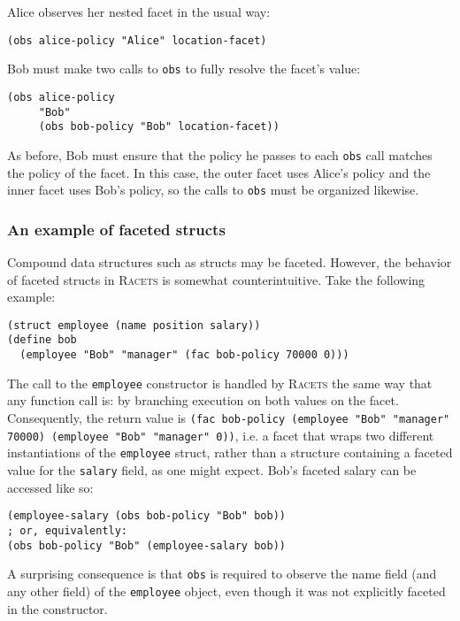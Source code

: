 \documentclass{article}
\begin{document}
Alice observes her nested facet in the usual way:

\begin{lstlisting}
(obs alice-policy "Alice" location-facet)
\end{lstlisting}

Bob must make two calls to \texttt{obs} to fully resolve the facet's value:

\begin{lstlisting}
(obs alice-policy
     "Bob"
     (obs bob-policy "Bob" location-facet))
\end{lstlisting}

As before, Bob must ensure that the policy he passes to each \texttt{obs} call matches the policy of the facet. In this case, the outer facet uses Alice's policy and the inner facet uses Bob's policy, so the calls to \texttt{obs} must be organized likewise.


\subsubsection{An example of faceted structs}
Compound data structures such as structs may be faceted. However, the behavior of faceted structs in \textsc{Racets} is somewhat counterintuitive. Take the following example:

\begin{lstlisting}
(struct employee (name position salary))
(define bob
  (employee "Bob" "manager" (fac bob-policy 70000 0)))
\end{lstlisting}

The call to the \texttt{employee} constructor is handled by \textsc{Racets} the same way that any function call is: by branching execution on both values on the facet. Consequently, the return value is \texttt{(fac bob-policy (employee "Bob" "manager" 70000) (employee "Bob" "manager" 0))}, i.e. a facet that wraps two different instantiations of the \texttt{employee} struct, rather than a structure containing a faceted value for the \texttt{salary} field, as one might expect. Bob's faceted salary can be accessed like so:

\begin{lstlisting}
(employee-salary (obs bob-policy "Bob" bob))
; or, equivalently:
(obs bob-policy "Bob" (employee-salary bob))
\end{lstlisting}

A surprising consequence is that \texttt{obs} is required to observe the name field (and any other field) of the \texttt{employee} object, even though it was not explicitly faceted in the constructor.
\end{document}
